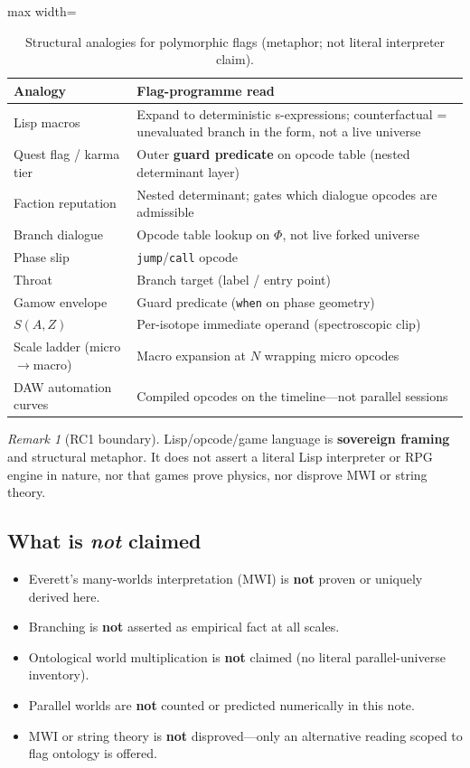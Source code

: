 \documentclass[11pt,a4paper]{article}
\theoremstyle{remark}
\newtheorem*{remark}{Remark}
\theoremstyle{definition}
\begin{document}
\begin{table}[H]
\centering
\caption{Structural analogies for polymorphic flags (metaphor; not literal interpreter claim).}
\label{tab:opcode}
\small
\begin{adjustbox}{max width=\linewidth}\begin{tabular}{@{}ll@{}}
\toprule
\textbf{Analogy} & \textbf{Flag-programme read} \\
\midrule
Lisp macros & Expand to deterministic s-expressions; counterfactual =
unevaluated branch in the form, not a live universe \\
Quest flag / karma tier & Outer \textbf{guard predicate} on opcode table
(nested determinant layer) \\
Faction reputation & Nested determinant; gates which dialogue opcodes are
admissible \\
Branch dialogue & Opcode table lookup on $\Phi$, not live forked universe \\
Phase slip & \texttt{jump}/\texttt{call} opcode \\
Throat & Branch target (label / entry point) \\
Gamow envelope & Guard predicate (\texttt{when} on phase geometry) \\
$S(A,Z)$ & Per-isotope immediate operand (spectroscopic clip) \\
Scale ladder (micro$\to$macro) & Macro expansion at $N$ wrapping micro opcodes \\
DAW automation curves & Compiled opcodes on the timeline---not parallel sessions \\
\bottomrule
\end{tabular}\end{adjustbox}
\end{table}

\begin{remark}[RC1 boundary]
Lisp/opcode/game language is \textbf{sovereign framing} and structural metaphor.
It does not assert a literal Lisp interpreter or RPG engine in nature, nor that
games prove physics, nor disprove MWI or string theory.
\end{remark}

\subsection{What is \emph{not} claimed}

\begin{itemize}[leftmargin=1.3em,itemsep=2pt]
  \item Everett's many-worlds interpretation (MWI) is \textbf{not} proven or
        uniquely derived here.
  \item Branching is \textbf{not} asserted as empirical fact at all scales.
  \item Ontological world multiplication is \textbf{not} claimed (no literal
        parallel-universe inventory).
  \item Parallel worlds are \textbf{not} counted or predicted numerically in
        this note.
  \item MWI or string theory is \textbf{not} disproved---only an alternative
        reading scoped to flag ontology is offered.
\end{itemize}
\end{document}
